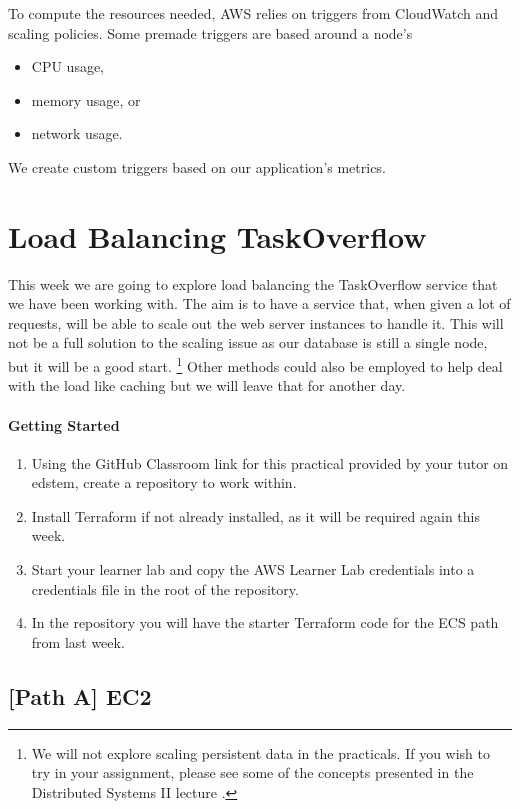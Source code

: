 \documentclass{csse4400}
\begin{document}
To compute the resources needed, AWS relies on triggers from CloudWatch and scaling policies.
Some premade triggers are based around a node's

\begin{itemize}
    \item CPU usage,
    \item memory usage, or 
    \item network usage.
\end{itemize}

We create custom triggers based on our application's metrics.

\section{Load Balancing TaskOverflow}

This week we are going to explore load balancing the TaskOverflow service that we have been working with.
The aim is to have a service that, when given a lot of requests,
will be able to scale out the web server instances to handle it.
This will not be a full solution to the scaling issue as our database is still a single node,
but it will be a good start.%
\footnote{We will not explore scaling persistent data in the practicals.
If you wish to try in your assignment,
please see some of the concepts presented in the Distributed Systems II lecture \cite{distributed2-slides}.}
Other methods could also be employed to help deal with the load like caching but we will leave that for another day.

\paragraph{Getting Started}
\begin{enumerate}
    \item Using the GitHub Classroom link for this practical provided by your tutor on edstem,
create a repository to work within.
    \item Install Terraform if not already installed, as it will be required again this week.
    \item Start your learner lab and copy the AWS Learner Lab credentials into a credentials file in the root of the repository.
    \item In the repository you will have the starter Terraform code for the ECS path from last week.
\end{enumerate}

\subsection{[Path A] EC2}
\end{document}
